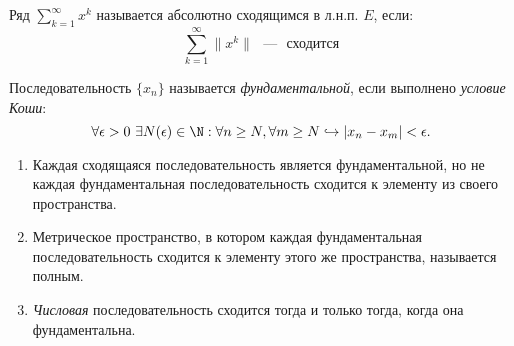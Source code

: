 \begin{definition}
	Ряд $\sum\limits_{k=1}^\infty x^k$ называется абсолютно сходящимся в л.н.п. $E$, если:\[
		\sum_{k=1}^{\infty} \|x^k\| \text{ ~---~ сходится}
	\]
\end{definition}
\begin{reminder}
    Последовательность $\{ x_{n} \}$ называется \textit{фундаментальной}, если выполнено \textit{условие Коши}:
$$ \forall \epsilon > 0 \  \exists N (\epsilon) \in \N: \forall n \geq N, \forall m \geq N \hookrightarrow |x_{n} - x_{m}| < \epsilon. $$
\begin{enumerate}
    \item Каждая сходящаяся последовательность является фундаментальной, но не каждая фундаментальная последовательность сходится к элементу из своего пространства.
    \item Метрическое пространство, в котором каждая фундаментальная последовательность сходится к элементу этого же пространства, называется полным.
    \item \textit{Числовая} последовательность сходится тогда и только тогда, когда она фундаментальна.
\end{enumerate}

\end{reminder}

